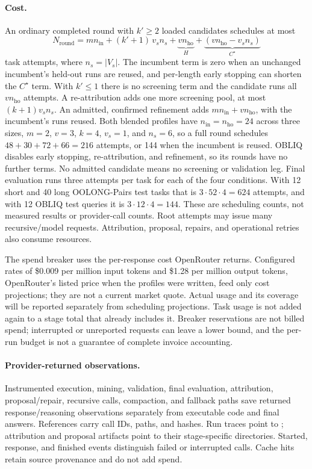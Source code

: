 \paragraph{Cost.}
An ordinary completed round with $k'\ge2$ loaded candidates schedules at most
\begin{equation}
N_{\mathrm{round}}=m n_{\mathrm{in}}
+(k'+1)\,v_s n_s
+\underbrace{v n_{\mathrm{ho}}}_{H}
+\underbrace{(v n_{\mathrm{ho}}-v_s n_s)}_{C^\star}
\label{eq:round-cost}
\end{equation}
task attempts, where $n_s=|V_s|$. The incumbent term is zero when an unchanged
incumbent's held-out runs are reused, and per-length early stopping can shorten
the $C^\star$ term. With $k'\le1$ there is no screening term and the candidate
runs all $v n_{\mathrm{ho}}$ attempts. A re-attribution adds one more screening
pool, at most $(k+1)v_s n_s$. An admitted, confirmed refinement adds
$m n_{\mathrm{in}}+v n_{\mathrm{ho}}$, with the incumbent's runs reused.
Both blended profiles have $n_{\mathrm{in}}=n_{\mathrm{ho}}=24$ across three
sizes, $m=2$, $v=3$, $k=4$, $v_s=1$, and $n_s=6$, so a full round schedules
$48+30+72+66=216$ attempts, or 144 when the incumbent is reused. OBLIQ disables
early stopping, re-attribution, and refinement, so its rounds have no further
terms. No admitted candidate means no screening or validation leg. Final
evaluation runs three attempts per task for each of the four conditions. With
12 short and 40 long OOLONG-Pairs test tasks that is $3\cdot52\cdot4=624$
attempts, and with 12 OBLIQ test queries it is $3\cdot12\cdot4=144$. These are
scheduling counts, not measured results or provider-call counts. Root attempts
may issue many recursive/model requests. Attribution, proposal, repairs, and
operational retries also consume resources.

The spend breaker uses the per-response cost OpenRouter returns. Configured
rates of \$0.009 per million input tokens and \$1.28 per million output tokens,
OpenRouter's listed price when the profiles were written, feed only cost
projections; they are not a current market quote. Actual usage and its coverage will be reported separately from scheduling
projections. Task usage is not added again to a stage total
that already includes it. Breaker reservations are not billed spend; interrupted
or unreported requests can leave a lower bound, and the per-run budget is not a
guarantee of complete invoice accounting.

\paragraph{Provider-returned observations.}
Instrumented execution, mining, validation, final evaluation, attribution,
proposal/repair, recursive calls, compaction, and fallback paths save returned
response/reasoning observations separately from executable code and final
answers. References carry call IDs, paths, and hashes. Run traces point to
; attribution and proposal artifacts point to
their stage-specific  directories. Started, response, and finished
events distinguish failed or interrupted calls. Cache hits retain source
provenance and do not add spend.


